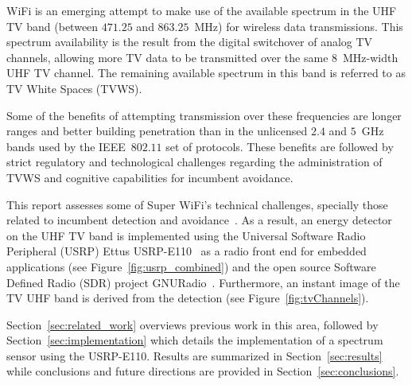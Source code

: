  WiFi is an emerging attempt to make use of the available spectrum in the UHF TV band (between $471.25$ and $863.25$~MHz) for wireless data transmissions. This spectrum availability is the result from the digital switchover of analog TV channels,  allowing more TV data to be transmitted over the same $8$~MHz-width UHF TV channel. The remaining available spectrum in this band is referred to as TV White Spaces (TVWS).

Some of the benefits of attempting transmission over these frequencies are longer ranges and better building penetration than in the unlicensed $2.4$ and $5$~GHz bands used by the IEEE~$802.11$ set of protocols. These benefits are followed by strict regulatory and technological challenges regarding the administration of TVWS and cognitive capabilities for incumbent avoidance.

This report assesses some of Super WiFi's technical challenges, specially those related to incumbent detection and avoidance~\cite{shellhammer2009technical}. As a result, an energy detector on the UHF TV band is implemented using the Universal Software Radio Peripheral (USRP) Ettus USRP-E110~\cite{ettusUSRPE110} as a radio front end for embedded applications (see Figure~\ref{fig:usrp_combined}) and the open source Software Defined Radio (SDR) project GNURadio~\cite{GNURadio}. Furthermore, an instant image of the TV UHF band is derived from the detection (see Figure~\ref{fig:tvChannels}).

Section~\ref{sec:related_work} overviews previous work in this area, followed by Section~\ref{sec:implementation} which details the implementation of a spectrum sensor using the USRP-E110. Results are summarized in Section~\ref{sec:results} while conclusions and future directions are provided in Section~\ref{sec:conclusions}.